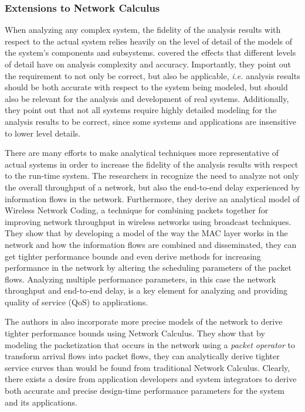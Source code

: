 \subsubsection{Extensions to Network Calculus}
When analyzing any complex system, the fidelity of the analysis
results with respect to the actual system relies heavily on the level
of detail of the models of the system's components and
subsystems. \cite{Heidemann2001} covered the effects that different
levels of detail have on analysis complexity and accuracy.
Importantly, they point out the requirement to not only be correct,
but also be applicable, \emph{i.e.} analysis results should be both
accurate with respect to the system being modeled, but should also be
relevant for the analysis and development of real systems.
Additionally, they point out that not all systems require highly
detailed modeling for the analysis results to be correct, since some
systems and applications are insensitive to lower level details.

There are many efforts to make analytical techniques more
representative of actual systems in order to increase the fidelity of
the analysis results with respect to the run-time system.  The
researchers in \cite{NCnetworkCoding} recognize the need to analyze
not only the overall throughput of a network, but also the end-to-end
delay experienced by information flows in the network.  Furthermore,
they derive an analytical model of Wireless Network
Coding\cite{networkcodingCOPE}, a technique for combining packets
together for improving network throughput in wireless networks using
broadcast techniques.  They show that by developing a model of the way
the MAC layer works in the network and how the information flows are
combined and disseminated, they can get tighter performance bounds and
even derive methods for increasing performance in the network by
altering the scheduling parameters of the packet flows.  Analyzing
multiple performance parameters, in this case the network throughput
and end-to-end delay, is a key element for analyzing and providing
quality of service (QoS) to applications.

The authors in \cite{NCpacketcurve2012} also incorporate more precise
models of the network to derive tighter performance bounds using
Network Calculus.  They show that by modeling the packetization that
occurs in the network using a \textit{packet operator} to transform
arrival flows into packet flows, they can analytically derive tighter
service curves than would be found from traditional Network Calculus.
Clearly, there exists a desire from application developers and system
integrators to derive both accurate and precise design-time
performance parameters for the system and its applications.


